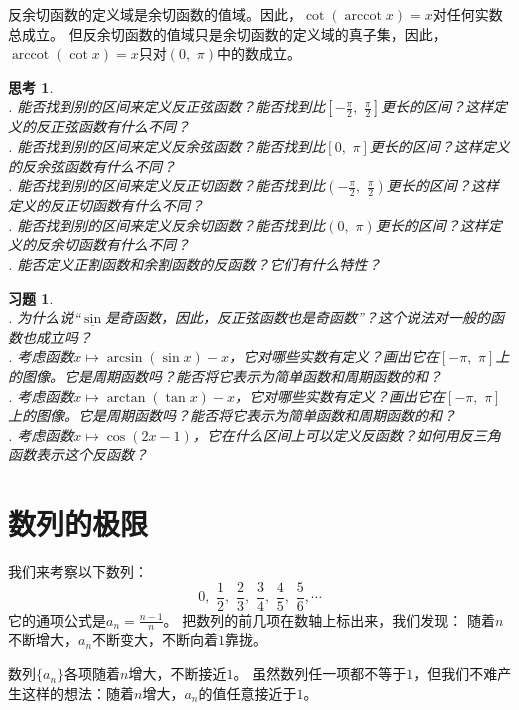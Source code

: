 \documentclass[12pt,UTF8]{ctexbook}
\newcommand{\arccot}{\operatorname{arccot}}
\newtheorem{sk}{思考}[section]
\newtheorem{xt}{习题}[section]
\begin{document}
反余切函数的定义域是余切函数的值域。因此，$\cot{(\arccot{x})} = x$对任何实数总成立。
但反余切函数的值域只是余切函数的定义域的真子集，因此，$\arccot{(\cot{x})} = x$只对$(0, \,\, \pi)$中的数成立。

\begin{sk}
    \mbox{} \\
    . 能否找到别的区间来定义反正弦函数？能否找到比$[-\frac{\pi}{2}, \,\, \frac{\pi}{2}]$更长的区间？这样定义的反正弦函数有什么不同？\\
    . 能否找到别的区间来定义反余弦函数？能否找到比$[0, \,\, \pi]$更长的区间？这样定义的反余弦函数有什么不同？\\
    . 能否找到别的区间来定义反正切函数？能否找到比$(-\frac{\pi}{2}, \,\, \frac{\pi}{2})$更长的区间？这样定义的反正切函数有什么不同？\\
    . 能否找到别的区间来定义反余切函数？能否找到比$(0, \,\, \pi)$更长的区间？这样定义的反余切函数有什么不同？\\
    . 能否定义正割函数和余割函数的反函数？它们有什么特性？
\end{sk}
\begin{xt}
    \mbox{} \\
    . 为什么说“$\underline{\sin}$是奇函数，因此，反正弦函数也是奇函数”？这个说法对一般的函数也成立吗？\\
    . 考虑函数$x\mapsto \arcsin{(\sin{x})} - x$，它对哪些实数有定义？画出它在$[-\pi, \,\, \pi]$上的图像。它是周期函数吗？能否将它表示为简单函数和周期函数的和？\\
    . 考虑函数$x\mapsto \arctan{(\tan{x})} - x$，它对哪些实数有定义？画出它在$[-\pi, \,\, \pi]$上的图像。它是周期函数吗？能否将它表示为简单函数和周期函数的和？\\
    . 考虑函数$x\mapsto \cos(2x - 1)$，它在什么区间上可以定义反函数？如何用反三角函数表示这个反函数？
\end{xt}

\chapter{数列的极限}

我们来考察以下数列：
$$ 0,\,\, \frac{1}{2}, \,\,\frac{2}{3},\,\, \frac{3}{4}, \,\,\frac{4}{5}, \,\,\frac{5}{6}, \cdots $$
它的通项公式是$a_n = \frac{n-1}{n}$。
把数列的前几项在数轴上标出来，我们发现：
随着$n$不断增大，$a_n$不断变大，不断向着$1$靠拢。

数列$\{a_n\}$各项随着$n$增大，不断接近$1$。
虽然数列任一项都不等于$1$，但我们不难产生这样的想法：随着$n$增大，$a_n$的值任意接近于$1$。
\end{document}
